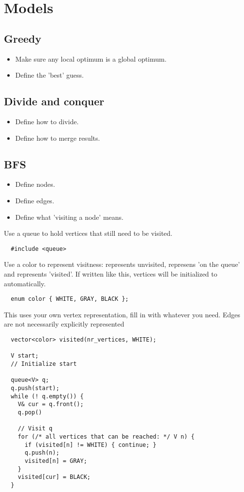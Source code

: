 \documentclass[guide.tex]{subfiles}
\begin{document}
\section{Models}
\subsection{Greedy}
\begin{itemize}
  \item Make sure any local optimum is a global optimum.
  \item Define the 'best' guess.
\end{itemize}

\subsection{Divide and conquer}
\begin{itemize}
  \item Define how to divide.
  \item Define how to merge results.
\end{itemize}

\subsection{BFS}
\begin{itemize}
  \item Define nodes.
  \item Define edges.
  \item Define what 'visiting a node' means.
\end{itemize}

Use a queue to hold vertices that still need to be visited.
\begin{verbatim}
  #include <queue>
\end{verbatim}
Use a color to represent visitness:  represents unvisited,  represens 'on the queue' and  represents 'visited'.
If written like this, vertices will be initialized to  automatically.
\begin{verbatim}
  enum color { WHITE, GRAY, BLACK };
\end{verbatim}
This uses your own vertex representation, fill in  with whatever you need.
Edges are not necessarily explicitly represented
\begin{verbatim}
  vector<color> visited(nr_vertices, WHITE);

  V start;
  // Initialize start

  queue<V> q;
  q.push(start);
  while (! q.empty()) {
    V& cur = q.front();
    q.pop()

    // Visit q
    for (/* all vertices that can be reached: */ V n) {
      if (visited[n] != WHITE) { continue; }
      q.push(n);
      visited[n] = GRAY;
    }
    visited[cur] = BLACK;
  }
\end{verbatim}
\end{document}
